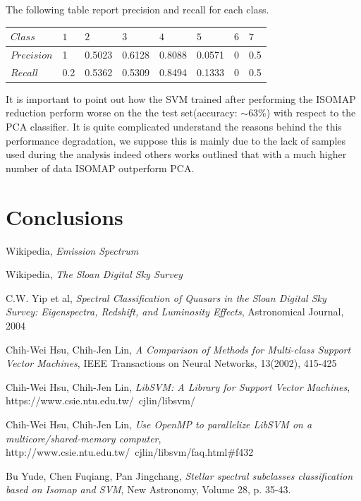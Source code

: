 \documentclass[a4paper,10pt]{article}
\begin{document}
      The following table report precision and recall for each class.
      \begin{table}[H]
      	\centering
	\begin{tabular}{l|P{1cm}P{1cm}P{1cm}P{1cm}P{1cm}P{1cm}P{1cm}} \toprule
	  {$Class$} & {$1$} & {$2$} & {$3$} & {$4$} & {$5$} & {$6$} & {$7$} \\ \midrule
	  $Precision$  & 1 & 0.5023 & 0.6128 & 0.8088 & 0.0571 & 0 & 0.5 \\ \midrule
	  $Recall$  & 0.2 & 0.5362 & 0.5309 & 0.8494 & 0.1333 & 0 & 0.5 \\ \bottomrule
	\end{tabular}
      \end{table}
      \noindent It is important to point out how the SVM trained after performing the ISOMAP reduction perform worse on the 
      the test set(accuracy: $\sim$63\%) with respect to the PCA classifier.\newline
      It is quite complicated understand the reasons behind the this performance degradation, we suppose this is mainly due to 
      the lack of samples used during the analysis indeed others works \cite{sdssiso} outlined that with a much higher number of
      data ISOMAP outperform PCA.
    
\newpage

\section{Conclusions}

\newpage

\begin{thebibliography}{9}
    Wikipedia,
    \emph{Emission Spectrum}
    
    Wikipedia,
    \emph{The Sloan Digital Sky Survey}
    
    C.W. Yip et al,
    \emph{Spectral Classification of Quasars in the Sloan Digital Sky Survey: Eigenspectra, Redshift, and Luminosity Effects},
    Astronomical Journal,
    2004
    
    Chih-Wei Hsu, Chih-Jen Lin,
    \emph{A Comparison of Methods for Multi-class Support Vector Machines},
    IEEE Transactions on Neural Networks, 13(2002), 415-425
    
    Chih-Wei Hsu, Chih-Jen Lin,
    \emph{LibSVM: A Library for Support Vector Machines},
    https://www.csie.ntu.edu.tw/~cjlin/libsvm/
    
    Chih-Wei Hsu, Chih-Jen Lin,
    \emph{Use OpenMP to parallelize LibSVM on a multicore/shared-memory computer},
    http://www.csie.ntu.edu.tw/~cjlin/libsvm/faq.html\#f432
    
    Bu Yude, Chen Fuqiang, Pan Jingchang,
    \emph{Stellar spectral subclasses classification based on Isomap and SVM},
    New Astronomy, Volume 28, p. 35-43.
    
\end{thebibliography}
\end{document}
